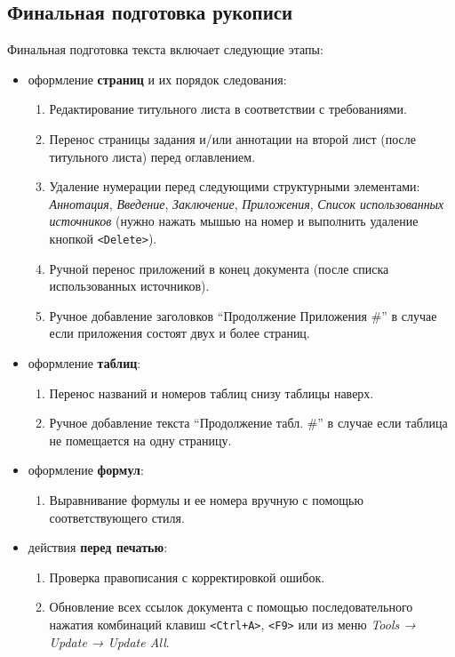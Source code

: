 \documentclass[
  a4paper,
]{book}
\providecommand{\tightlist}{%
  \setlength{\itemsep}{0pt}\setlength{\parskip}{0pt}}
\theoremstyle{definition}
\theoremstyle{definition}
\theoremstyle{definition}
\theoremstyle{definition}
\theoremstyle{remark}
\begin{document}
\subsection{Финальная подготовка рукописи}\label{authoring-odt-final}

Финальная подготовка текста включает следующие этапы:

\begin{itemize}
\item
  оформление \textbf{страниц} и их порядок следования:

  \begin{enumerate}
  \def\labelenumi{\arabic{enumi}.}
  \tightlist
  \item
    Редактирование титульного листа в соответствии с требованиями.
  \item
    Перенос страницы задания и/или аннотации на второй лист (после титульного листа) перед оглавлением.
  \item
    Удаление нумерации перед следующими структурными элементами: \emph{Аннотация}, \emph{Введение}, \emph{Заключение}, \emph{Приложения}, \emph{Список использованных источников} (нужно нажать мышью на номер и выполнить удаление кнопкой \texttt{\textless{}Delete\textgreater{}}).
  \item
    Ручной перенос приложений в конец документа (после списка использованных источников).
  \item
    Ручное добавление заголовков ``Продолжение Приложения \#'' в случае если приложения состоят двух и более страниц.
  \end{enumerate}
\item
  оформление \textbf{таблиц}:

  \begin{enumerate}
  \def\labelenumi{\arabic{enumi}.}
  \tightlist
  \item
    Перенос названий и номеров таблиц снизу таблицы наверх.
  \item
    Ручное добавление текста ``Продолжение табл. \#'' в случае если таблица не помещается на одну страницу.
  \end{enumerate}
\item
  оформление \textbf{формул}:

  \begin{enumerate}
  \def\labelenumi{\arabic{enumi}.}
  \tightlist
  \item
    Выравнивание формулы и ее номера вручную с помощью соответствующего стиля.
  \end{enumerate}
\item
  действия \textbf{перед печатью}:

  \begin{enumerate}
  \def\labelenumi{\arabic{enumi}.}
  \tightlist
  \item
    Проверка правописания с корректировкой ошибок.
  \item
    Обновление всех ссылок документа с помощью последовательного нажатия комбинаций клавиш \texttt{\textless{}Ctrl+A\textgreater{}}, \texttt{\textless{}F9\textgreater{}} или из меню \emph{Tools → Update → Update All}.
  \end{enumerate}
\end{itemize}
\end{document}
